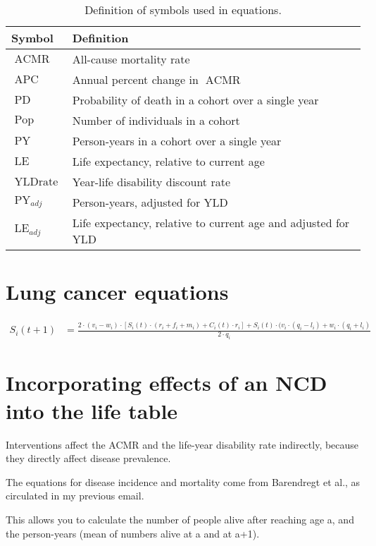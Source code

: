 \documentclass[12pt]{scrartcl}
\DeclareMathOperator{\APC}{APC}
\DeclareMathOperator{\ACMR}{ACMR}
\DeclareMathOperator{\PD}{PD}
\DeclareMathOperator{\PY}{PY}
\DeclareMathOperator{\LE}{LE}
\DeclareMathOperator{\Pop}{Pop}
\DeclareMathOperator{\YLDrate}{YLDrate}
\begin{document}
\begin{table}
  \centering
  \begin{tabular}{ll}
    \toprule
    Symbol & Definition \\
    \midrule
    \(\ACMR\) & All-cause mortality rate \\
    \(\APC\) & Annual percent change in \(\ACMR\) \\
    \(\PD\) & Probability of death in a cohort over a single year \\
    \(\Pop\) & Number of individuals in a cohort \\
    \(\PY\) & Person-years in a cohort over a single year \\
    \(\LE\) & Life expectancy, relative to current age \\
    \(\YLDrate\) & Year-life disability discount rate \\
    \(\PY_{adj}\) & Person-years, adjusted for YLD \\
    \(\LE_{adj}\) & Life expectancy, relative to current age and adjusted for YLD \\
    \bottomrule
  \end{tabular}
  \caption{Definition of symbols used in equations.}
  \label{tbl:defns}
\end{table}

\section*{Lung cancer equations}

\begin{align*}
  S_i(t+1) &= \frac{2 \cdot (v_i - w_i) \cdot%
    \left[ S_i(t) \cdot(r_i + f_i + m_i) + C_i(t) \cdot r_i \right]%
    + S_i(t) \cdot (v_i \cdot (q_i - l_i) + w_i \cdot (q_i + l_i)%
  }{2 \cdot q_i}
\end{align*}

\section*{Incorporating effects of an NCD into the life table}

Interventions affect the ACMR and the life-year disability rate indirectly, because they directly affect disease prevalence.

The equations for disease incidence and mortality come from Barendregt et al., as circulated in my previous email.

This allows you to calculate the number of people alive after reaching age a, and the person-years (mean of numbers alive at a and at a+1).
\end{document}
